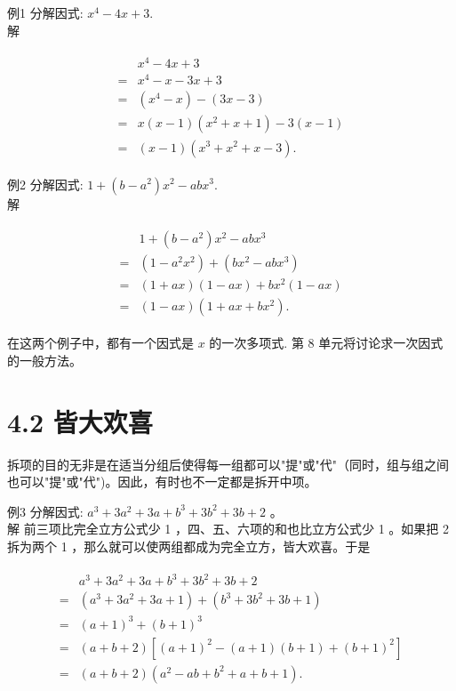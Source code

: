\documentclass[10pt]{article}
\begin{document}
例1 分解因式: $x^{4}-4 x+3$.\\
解

\begin{align*}
\begin{aligned}
& x^{4}-4 x+3 \\
= & x^{4}-x-3 x+3 \\
= & \left(x^{4}-x\right)-(3 x-3) \\
= & x(x-1)\left(x^{2}+x+1\right)-3(x-1) \\
= & (x-1)\left(x^{3}+x^{2}+x-3\right) .
\end{aligned}
\end{align*}

例2 分解因式: $1+\left(b-a^{2}\right) x^{2}-a b x^{3}$.\\
解

\begin{align*}
\begin{aligned}
& 1+\left(b-a^{2}\right) x^{2}-a b x^{3} \\
= & \left(1-a^{2} x^{2}\right)+\left(b x^{2}-a b x^{3}\right) \\
= & (1+a x)(1-a x)+b x^{2}(1-a x) \\
= & (1-a x)\left(1+a x+b x^{2}\right) .
\end{aligned}
\end{align*}

在这两个例子中，都有一个因式是 $x$ 的一次多项式. 第 8 单元将讨论求一次因式的一般方法。

\section*{4.2 皆大欢喜}
拆项的目的无非是在适当分组后使得每一组都可以"提"或"代"（同时，组与组之间也可以"提"或"代")。因此，有时也不一定都是拆开中项。

例3 分解因式: $a^{3}+3 a^{2}+3 a+b^{3}+3 b^{2}+3 b+2$ 。\\
解 前三项比完全立方公式少 1 ，四、五、六项的和也比立方公式少 1 。如果把 2 拆为两个 1 ，那么就可以使两组都成为完全立方，皆大欢喜。于是

\begin{align*}
\begin{aligned}
& a^{3}+3 a^{2}+3 a+b^{3}+3 b^{2}+3 b+2 \\
= & \left(a^{3}+3 a^{2}+3 a+1\right)+\left(b^{3}+3 b^{2}+3 b+1\right) \\
= & (a+1)^{3}+(b+1)^{3} \\
= & (a+b+2)\left[(a+1)^{2}-(a+1)(b+1)+(b+1)^{2}\right] \\
= & (a+b+2)\left(a^{2}-a b+b^{2}+a+b+1\right) .
\end{aligned}
\end{align*}
\end{document}
